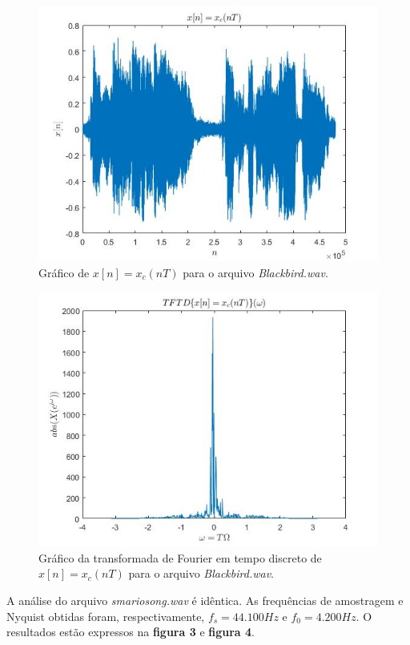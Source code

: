 \documentclass[a4paper, 12pt]{article}
\begin{document}
\begin{figure}[H]
	\centering
	\includegraphics[scale=0.7]{img1.jpg} 
	\caption{Gráfico de $x[n]=x_c(nT)$ para o arquivo \textit{Blackbird.wav}.}
	\label{fig:1}
\end{figure}

\begin{figure}[H]
	\centering
	\includegraphics[scale=0.7]{img2.jpg} 
	\caption{Gráfico da transformada de Fourier em tempo discreto de  $x[n]=x_c(nT)$ para o arquivo \textit{Blackbird.wav}.}
	\label{fig:2}
\end{figure}

A análise do arquivo \textit{smariosong.wav} é idêntica. As frequências de amostragem e Nyquist obtidas foram, respectivamente, $f_s= 44.100 Hz$ e $f_0= 4.200 Hz$. O resultados estão expressos na \textbf{figura 3} e \textbf{figura 4}.
\end{document}
